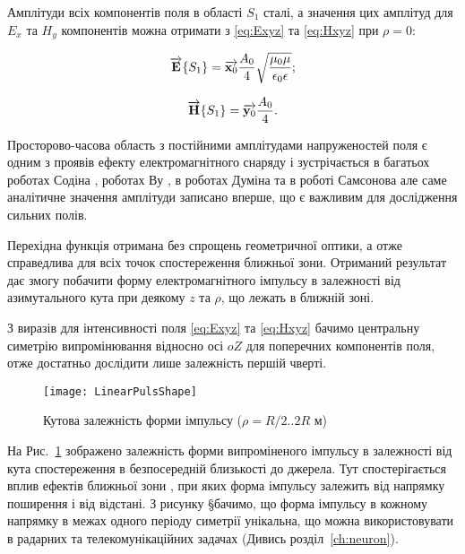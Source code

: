 Амплітуди всіх компонентів поля в області $ S_1 $ сталі, а значення 
цих амплітуд для $ E_x $ та $ H_y $ компонентів можна отримати з 
\eqref{eq:Exyz} та \eqref{eq:Hxyz} при $ \rho = 0 $:

\begin{equation*} \begin{aligned}
\overrightarrow{\mathbf E} \{ S_1 \} = 
\overrightarrow{\mathbf x_0} \frac{A_0}{4} 
\sqrt{\frac{\mu_0 \mu}{\epsilon_0 \epsilon}};
\end{aligned} \end{equation*}

\begin{equation*} \begin{aligned} 
\overrightarrow{\mathbf H} \{ S_1 \} = \overrightarrow{\mathbf y_0} \frac{A_0}{4}.
\end{aligned} \end{equation*}

Просторово-часова область з  постійними амплітудами напруженостей поля є 
одним з проявів ефекту електромагнітного снаряду і
зустрічається в багатьох роботах Содіна \cite{imp:Sodin1991, 
imp:Sodin1992-5, imp:Sodin1992-10, imp:Sodin1997}, роботах Ву 
\cite{imp:Wu1985, imp:Wu1987, imp:Wu1991}, в роботах Думіна
\cite{imp:Dumin1996} та в роботі Самсонова \cite{imp:Samsonov1986} але 
саме аналітичне значення амплітуди записано вперше, що є важливим для 
дослідження сильних полів.

Перехідна функція отримана без спрощень геометричної оптики, а отже 
справедлива для всіх точок спостереження ближньої зони. Отриманий результат 
дає змогу побачити форму електромагнітного імпульсу в залежності від 
азимутального кута при деякому $ z $ та $ \rho $, що лежать в ближній зоні.

З виразів для інтенсивності поля \eqref{eq:Exyz} та \eqref{eq:Hxyz} бачимо
центральну симетрію випромінювання відносно осі $ oZ $ для поперечних 
компонентів поля, отже достатньо дослідити лише залежність першій чверті.

\begin{figure}[h] \begin{center}
\texttt{[image: LinearPulsShape]}
\caption{Кутова залежність форми імпульсу ($ \rho = R/2 .. 2R $ м)} 
\label{fig:emp_shape}
\end{center} \end{figure}

На Рис.~\ref{fig:emp_shape} зображено залежність форми випроміненого 
імпульсу в залежності від кута спостереження в безпосередній близькості 
до джерела. Тут спостерігається вплив ефектів ближньої зони 
\cite{imp:Schantz2005}, при яких форма імпульсу залежить від напрямку 
поширення і від відстані. З рисунку §бачимо, що форма імпульсу в 
кожному напрямку в межах одного періоду симетрії унікальна, що можна 
використовувати в радарних та телекомунікаційних задачах 
(Дивись розділ~\ref{ch:neuron}).


